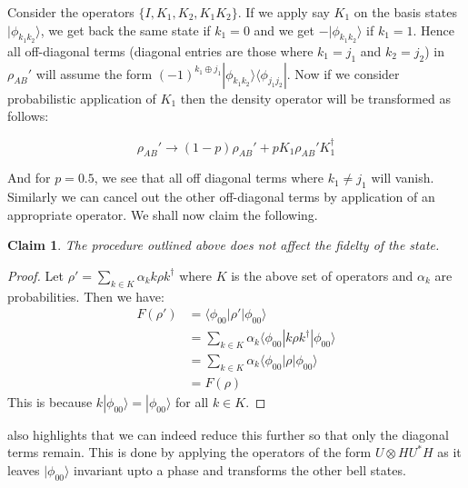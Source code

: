 \documentclass[conference]{IEEEtran}
\newtheorem{claim}{Claim}
\begin{document}
Consider the operators $\{I, K_1, K_2, K_1 K_2\}$. If we apply say $K_1$ on the basis states $| \phi_{k_1 k_2} \rangle$, we get back the same state if $k_1 = 0$ and we get $- | \phi_{k_1 k_2} \rangle$ if $k_1 = 1$. Hence all off-diagonal terms (diagonal entries are those where $k_1 = j_1$ and $k_2 = j_2$) in $\rho_{AB}'$ will assume the form $(-1)^{k_1 \oplus j_1} | \phi_{k_1 k_2} \rangle \langle \phi_{j_1 j_2} |$. Now if we consider probabilistic application of $K_1$ then the density operator will be transformed as follows:

\begin{equation}
    \rho_{AB}' \rightarrow (1-p)\rho_{AB}' + p K_1 \rho_{AB}' K_1^\dagger
\end{equation}

And for $p = 0.5$, we see that all off diagonal terms where $k_1 \neq j_1$ will vanish. Similarly we can cancel out the other off-diagonal terms by application of an appropriate operator. We shall now claim the following.

\begin{claim}
    The procedure outlined above does not affect the fidelty of the state.
\end{claim}

\begin{proof}
    Let $\rho' = \sum_{k \in K} \alpha_k k \rho k^\dagger$ where $K$ is the above set of operators and $\alpha_k$ are probabilities. Then we have:
    \begin{equation}
        \begin{aligned}
            F(\rho') &= \langle \phi_{00} | \rho' | \phi_{00} \rangle \\
            &= \sum_{k \in K} \alpha_k \langle \phi_{00} | k \rho k^\dagger | \phi_{00} \rangle \\
            &= \sum_{k \in K} \alpha_k \langle \phi_{00} | \rho | \phi_{00} \rangle \\
            &= F(\rho)
        \end{aligned}
    \end{equation}
    This is because $k | \phi_{00} \rangle = | \phi_{00} \rangle$ for all $k \in K$.
\end{proof}

\cite{paper2} also highlights that we can indeed reduce this further so that only the diagonal terms remain. This is done by applying the operators of the form $U \otimes HU^*H$ as it leaves $| \phi_{00} \rangle$ invariant upto a phase and transforms the other bell states.
\end{document}
